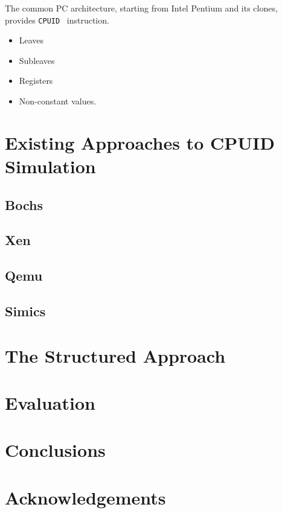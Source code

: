 \documentclass[a4paper,10pt,oneside,unicode]{article}
\begin{document}
The common PC architecture, starting from Intel Pentium and its clones, provides \texttt{CPUID}~\cite{intelmanual-7vols} instruction. 

\begin{itemize}
\item Leaves
\item Subleaves
\item Registers
\item Non-constant values.

\end{itemize}

\section{Existing Approaches to CPUID Simulation}

\subsection{Bochs}

\subsection{Xen}

\subsection{Qemu}

\subsection{Simics}

\section{The Structured Approach}

\section{Evaluation}

\section{Conclusions}

\section{Acknowledgements}


\end{document}
